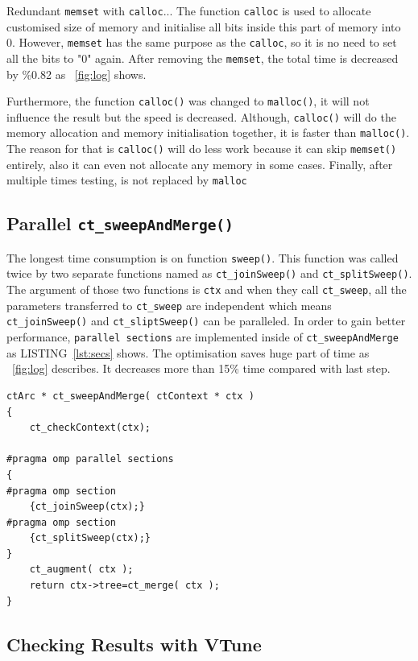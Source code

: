 \documentclass[conference]{IEEEtran}
\newcommand{\fref}[1]{\figurename~\ref{#1}}
\newcommand{\lref}[1]{LISTING~\ref{#1}}
\begin{document}
Redundant \texttt{memset} with \texttt{calloc}...
The function \texttt{calloc} is used to allocate customised size of memory and initialise all bits inside this part of memory into 0. However, \texttt{memset} has the same purpose as the \texttt{calloc}, so it is no need to set all the bits to "0" again. After removing the \texttt{memset}, the total time is decreased by \%0.82 as \fref{fig:log} shows. 

Furthermore, the function \texttt{calloc()} was changed to \texttt{malloc()}, it will not influence the result but the speed is decreased. Although, \texttt{calloc()} will do the memory allocation and memory initialisation together, it is faster than \texttt{malloc()}. The reason for that is \texttt{calloc()} will do less work because it can skip \texttt{memset()} entirely, also it can even not allocate any memory in some cases. Finally, after multiple times testing, \cite{calloc} is not replaced by \texttt{malloc}

\subsection{Parallel \texttt{ct\_sweepAndMerge()}}
The longest time consumption is on function \texttt{sweep()}. This function was called twice by two separate functions named as \texttt{ct\_joinSweep()} and \texttt{ct\_splitSweep()}. The argument of those two functions is \texttt{ctx} and when they call \texttt{ct\_sweep}, all the parameters transferred to \texttt{ct\_sweep} are independent which means \texttt{ct\_joinSweep()} and \texttt{ct\_sliptSweep()} can be paralleled. In order to gain better performance, \texttt{parallel sections} are implemented inside of \texttt{ct\_sweepAndMerge} as \lref{lst:secs} shows. The optimisation saves huge part of time as \fref{fig:log} describes. It decreases more than 15\% time compared with last step. 
\begin{lstlisting}[caption={Data Load with SIMD Intrinsics},captionpos=b,label=lst:secs]
ctArc * ct_sweepAndMerge( ctContext * ctx )
{
	ct_checkContext(ctx);
	
#pragma omp parallel sections    
{    
#pragma omp section
    {ct_joinSweep(ctx);}
#pragma omp section
    {ct_splitSweep(ctx);}
}   
    ct_augment( ctx );
    return ctx->tree=ct_merge( ctx );
}
\end{lstlisting}

\subsection{Checking Results with VTune}
\end{document}
